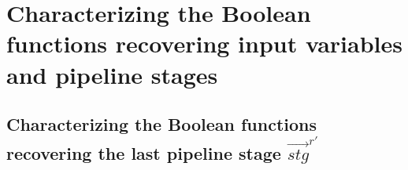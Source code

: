 \documentclass[conference]{IEEEtran}
\begin{document}
% 
% 
% 

% 
% 


\section{Characterizing the Boolean functions recovering input variables and pipeline stages}\label{sec_char}
\subsection{Characterizing the Boolean functions recovering the last pipeline stage $\vec{stg}^{r'}$}
\end{document}
